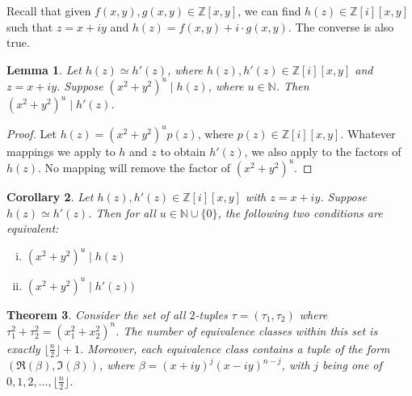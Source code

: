 \documentclass[12pt]{article}
\newtheorem{theorem}{Theorem}[section]
\newtheorem{lemma}[theorem]{Lemma}
\newtheorem{corollary}[theorem]{Corollary}
\theoremstyle{definition}
\newcommand{\vanish}[1]{}
\newcommand{\divides}{\mid}
\numberwithin{equation}{section}
\begin{document}
Recall that given \( f(x,y), g(x,y) \in \mathbb{Z}[x,y] \),
we can find \( h(z) \in \mathbb{Z} [i][x,y] \)
such that
\( z = x + iy \)
and
\( h(z) = f(x,y) + i \cdot g(x,y) \). 
The converse is also true.



\begin{lemma}
Let \( h(z) \simeq h'(z) \), where \( h(z), h'(z) \in \mathbb{Z}[i][x,y] \)
 and \( z = x+ iy \). Suppose \( ( x^2 + y^2 ) ^ u
    \divides h(z) \), where \( u \in \mathbb{N} \). Then \( ( x^2 + y^2 ) ^ u \divides h'(z) \).
\end{lemma}
   
\begin{proof}
Let \( h(z) = ( x^2 + y^2 ) ^ u  p(z) \), where \( p(z) \in \mathbb{Z} [i][x,y] \). 
Whatever mappings we apply to \(h\) and \(z\)
to obtain \( h'(z) \), we also apply to the factors of \( h(z) \). 
No mapping will remove the factor of \( ( x^2 + y^2 ) ^ u \).

\end{proof}

\vanish{
\begin{corollary}
Let \( h(z), h'(z) \in \mathbb{Z}[i][x,y] \) with \( z = x+ iy \).
\[
h(z) \simeq h'(z) 
\implies 
( \forall u \in \mathbb{N} \cup \{ 0 \},  ( x^2 + y^2 ) ^ u \divides h(z)  \iff ( x^2 + y^2 ) ^ u \divides h'(z)  )
\]
\end{corollary}
}

\begin{corollary}
\label{corollary_equivalence}
Let \( h(z), h'(z) \in \mathbb{Z}[i][x,y] \) with \( z = x+ iy \).
Suppose \( h(z) \simeq h'(z) \). Then for all  \( u \in \mathbb{N} \cup \{ 0 \} \),
the following two conditions are
equivalent:
\begin{enumerate}[i.]
\item \( ( x^2 + y^2 ) ^ u \divides h(z) \)
\item \( ( x^2 + y^2 ) ^ u \divides h'(z)  ) \)
\end{enumerate}
\end{corollary}




\begin{theorem}
Consider the set of all \(2\)-tuples \( \tau = ( \tau_1, \tau_2 )\) where 
\(
  \tau_1 ^ 2   +   \tau_2 ^ 2   
= 
\left(  x_1 ^ 2 + x_2 ^ 2  \right) ^ n 
\).
The number of equivalence classes within this set 
is exactly  \( \lfloor \frac{n}{2} \rfloor + 1 \). 
Moreover, each equivalence class contains a tuple
of the form \( ( \Re( \beta ) , \Im( \beta ) ) \),
where \( \beta = (x + iy)^j (x -  iy)^{n-j} \),
with \( j \)
being one of \( 0, 1, 2, \ldots, \lfloor \frac{n}{2} \rfloor \).
\end{theorem}
\end{document}

